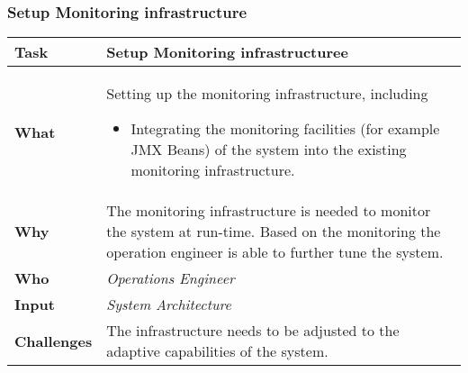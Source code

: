 \subsubsection{Setup Monitoring infrastructure}
\begin{tabularx}{\textwidth}{@{} l X @{}}
	\caption{Setup Monitoring infrastructure} \label{table:ch6_Task_Setup_Monitoring_infrastructure}\\
	\toprule 
	\bfseries Task & Setup Monitoring infrastructuree\\
	\midrule 
	\bfseries What & Setting up the monitoring infrastructure, including
	\begin{itemize}
		\item Integrating the monitoring facilities (for example \ac{JMX} Beans) of the system into the existing monitoring infrastructure.
	\end{itemize}
	\\
	\midrule 
	\bfseries Why & The monitoring infrastructure is needed to monitor the system at run-time. Based on the monitoring the operation engineer is able to further tune the system.\\
	\midrule 
	\bfseries Who & \emph{Operations Engineer}\\
	\midrule 
	\bfseries Input & \emph{System Architecture}\\
	\midrule 
	\bfseries Challenges & The infrastructure needs to be adjusted to the adaptive capabilities of the system.\\
	\bottomrule 
\end{tabularx}

